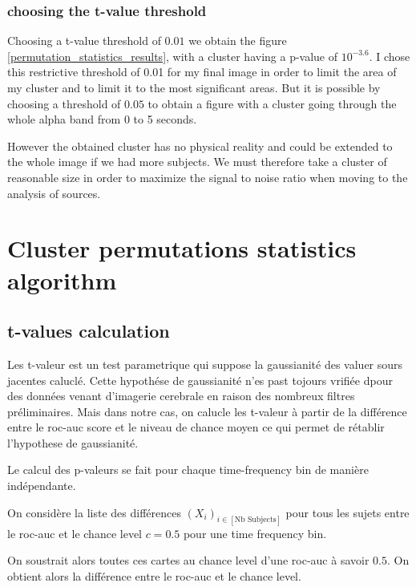 
\subsubsection{choosing the t-value threshold}
Choosing a t-value threshold of $0.01$ we obtain the figure \ref{permutation_statistics_results}, with a cluster having a p-value of $10^{-3.6}$. I chose this restrictive threshold of 0.01 for my final image in order to limit the area of my cluster and to limit it to the most significant areas. But it is possible by choosing a threshold of $0.05$ to obtain a figure with a cluster going through the whole alpha band from 0 to 5 seconds.

However the obtained cluster has no physical reality and could be extended to the whole image if we had more subjects. We must therefore take a cluster of reasonable size in order to maximize the signal to noise ratio when moving to the analysis of sources.

\section{Cluster permutations statistics algorithm}

\subsection{t-values calculation}

Les t-valeur est un test parametrique qui suppose la gaussianité des valuer sours jacentes caluclé. Cette hypothése de gaussianité n'es past tojours vrifiée dpour des données venant d'imagerie cerebrale en raison des nombreux filtres préliminaires. Mais dans notre cas, on calucle les t-valeur à partir de la différence entre le roc-auc score et le niveau de chance moyen ce qui permet de rétablir l'hypothese de gaussianité.

Le calcul des p-valeurs se fait pour chaque time-frequency bin de manière indépendante.

On considère la liste des différences $(X_i)_{i \in [\text{Nb Subjects}]}$ pour tous les sujets entre le roc-auc et le chance level $c=0.5$ pour une time frequency bin.

On soustrait alors toutes ces cartes au chance level d'une roc-auc à savoir $0.5$. On obtient alors la différence entre le roc-auc et le chance level.

